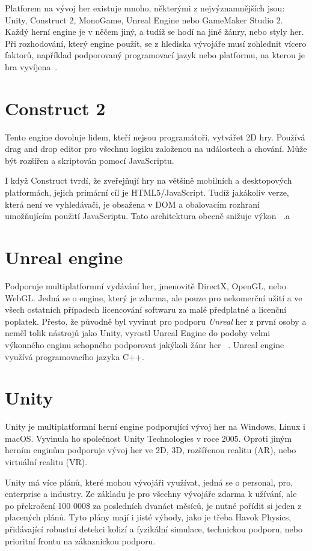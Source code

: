 Platforem na vývoj her existuje mnoho, některými z nejvýznamnějších jsou: Unity, Construct 2, MonoGame, Unreal Engine nebo GameMaker Studio 2. Každý herní engine je v něčem jiný, a tudíž se hodí na jiné žánry, nebo styly her. Při rozhodování, který engine použít, se z hlediska vývojáře musí zohlednit vícero faktorů, například podporovaný programovací jazyk nebo platformu, na kterou je hra vyvíjena~\cite{vohera2021game}.

\section{Construct 2}
Tento engine dovoluje lidem, kteří nejsou programátoři, vytvářet 2D hry. Používá drag and drop editor pro všechnu logiku založenou na událostech a chování. Může být rozšířen a skriptován pomocí JavaScriptu. 

I když Construct tvrdí, že zveřejňují hry na většině mobilních a desktopových platformách, jejich primární cíl je HTML5/JavaScript. Tudíž jakákoliv verze, která není ve vyhledávači, je obsažena v DOM a obalovacím rozhraní umožňujícím použití JavaScriptu. Tato architektura obecně snižuje výkon ~\cite{engines}.a

\section{Unreal engine}
Podporuje multiplatformní vydávání her, jmenovitě DirectX, OpenGL, nebo WebGL. Jedná se o engine, který je zdarma, ale pouze pro nekomerční užití a ve všech ostatních případech licencování softwaru za malé předplatné a licenční poplatek. Přesto, že původně byl vyvinut pro podporu \textit{Unreal} her z první osoby a neměl tolik nástrojů jako Unity, vyrostl Unreal Engine do podoby velmi výkonného enginu schopného podporovat jakýkoli žánr her ~\cite{engines}. Unreal engine využívá programovacího jazyka C++.

\section{Unity}
\label{unity}
Unity je multiplatformní herní engine podporující vývoj her na Windows, Linux i macOS.
Vyvinula ho společnost Unity Technologies v roce 2005. Oproti jiným herním enginům podporuje vývoj her ve 2D, 3D, rozšířenou realitu (AR), nebo virtuální realitu (VR). 

Unity má více plánů, které mohou vývojáři využívat, jedná se o personal, pro, enterprise a industry. Ze základu je pro všechny vývojáře zdarma k užívání, ale po překročení 100 000\$ za posledních dvanáct měsíců, je nutné pořídit si jeden z placených plánů. Tyto plány mají i jisté výhody, jako je třeba Havok Physics, přidávající robustní detekci kolizí a fyzikální simulace, technickou podporu, nebo prioritní frontu na zákaznickou podporu.~\cite{UnityPlans} 

